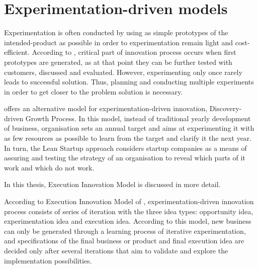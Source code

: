 \section{Experimentation-driven models}
Experimentation is often conducted by using as simple prototypes of the intended-product as possible in order to experimentation remain light and cost-efficient. According to \citet{thomke2001enlightened}, critical part of innovation process occurs when first prototypes are generated, as at that point they can be further tested with customers, discussed and evaluated. However, experimenting only once rarely leads to successful solution. Thus, planning and conducting multiple experiments in order to get closer to the problem solution is necessary. \citep{thomke1998modes} 

\citet{mcgrath2010business} offers an alternative model for experimentation-driven innovation, Discovery-driven Growth Process. In this model, instead of traditional yearly development of business, organisation sets an annual target and aims at experimenting it with as few resources as possible to learn from the target and clarify it the next year. In turn, the Lean Startup approach considers startup companies as a means of assuring and testing the strategy of an organisation to reveal which parts of it work and which do not work. \citep{ries2011lean}

In this thesis, Execution Innovation Model is discussed in more detail. 

According to Execution Innovation Model of \citet{tuulenmaki2011art}, experimentation-driven innovation process consists of series of iteration with the three idea types: opportunity idea, experimentation idea and execution idea. According to this model, new business can only be generated through a learning process of iterative experimentation, and specifications of the final business or product and final execution idea are decided only after several iterations that aim to validate and explore the implementation possibilities. \citep{tuulenmaki2011art} 

